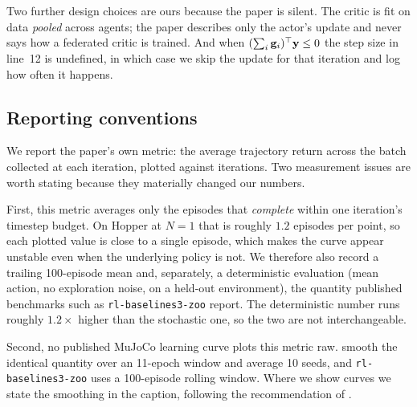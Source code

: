 Two further design choices are ours because the paper is silent. The critic is
fit on data \emph{pooled} across agents; the paper describes only the actor's
update and never says how a federated critic is trained. And when $(\sum_i
\mathbf{g}_i)^{\top}\mathbf{y} \le 0$ the step size in line~12 is undefined, in which case
we skip the update for that iteration and log how often it happens.

\subsection{Reporting conventions}

We report the paper's own metric: the average trajectory return across the
batch collected at each iteration, plotted against iterations. Two measurement
issues are worth stating because they materially changed our numbers.

First, this metric averages only the episodes that \emph{complete} within one
iteration's timestep budget. On Hopper at $N=1$ that is roughly $1.2$ episodes
per point, so each plotted value is close to a single episode, which makes the
curve appear unstable even when the underlying policy is not. We therefore
also record a trailing 100-episode mean and, separately, a deterministic
evaluation (mean action, no exploration noise, on a held-out environment), the
quantity published benchmarks such as \texttt{rl-baselines3-zoo} report. The
deterministic number runs roughly $1.2\times$ higher than the stochastic one,
so the two are not interchangeable.

Second, no published MuJoCo learning curve plots this metric raw.
\citet{spinningup} smooth the identical quantity over an 11-epoch window and
average 10 seeds, and \texttt{rl-baselines3-zoo} uses a 100-episode rolling
window. Where we show curves we state the smoothing in the caption, following
the recommendation of \citet{huang2024openrlbenchmark}.

